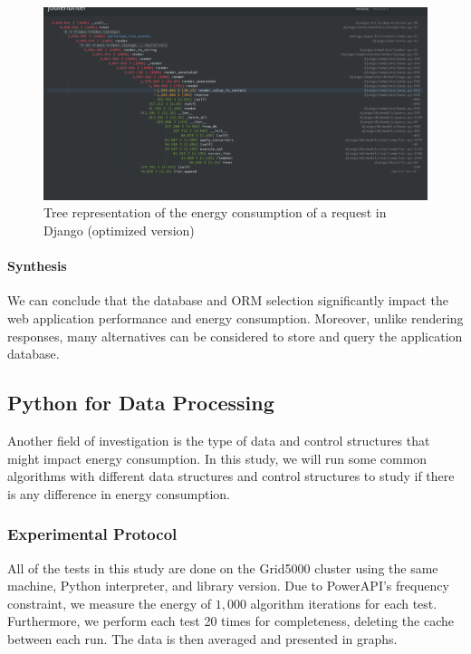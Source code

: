 \begin{figure}[!hbt]
    \centering
    \includegraphics[width=\linewidth]{imgs/django_profiled_optimized}
    \caption{Tree representation of the energy consumption of a request in Django (optimized version)}
    \label{fig:django_profiled_optimized}
\end{figure}

\paragraph{Synthesis}
We can conclude that the database and ORM selection significantly impact the web application performance and energy consumption.
Moreover, unlike rendering responses, many alternatives can be considered to store and query the application database.

\subsection{Python for Data Processing}
Another field of investigation is the type of data and control structures that might impact energy consumption.
In this study, we will run some common algorithms with different data structures and control structures to study if there is any difference in energy consumption.
\subsubsection{Experimental Protocol}
All of the tests in this study are done on the Grid5000 cluster using the same machine, Python interpreter, and library version.
Due to PowerAPI's frequency constraint, we measure the energy of $1,000$ algorithm iterations for each test.
Furthermore, we perform each test 20 times for completeness, deleting the cache between each run.
The data is then averaged and presented in graphs.

